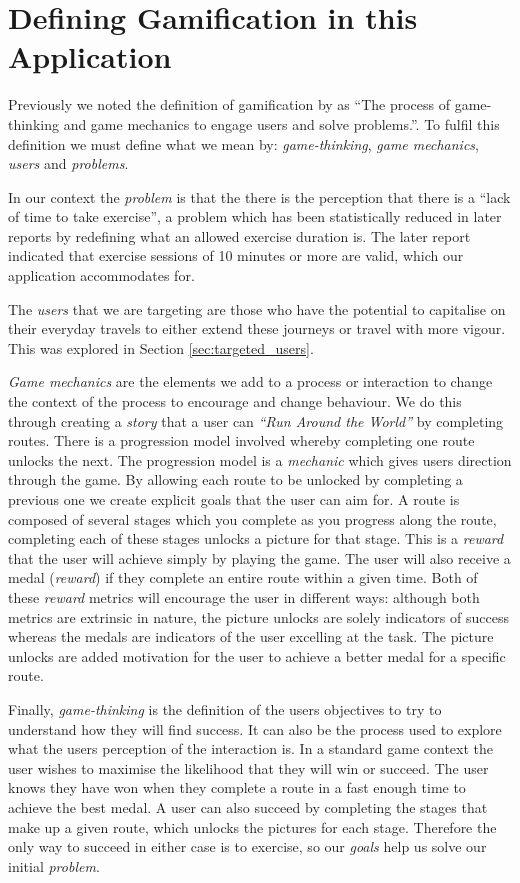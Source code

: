 \section{Defining Gamification in this Application}

Previously we noted the definition of gamification by
\citet{gamification_book} as ``The process of
game-thinking and game mechanics to engage users and solve
problems.''. To fulfil this definition we must define what we mean
by: \emph{game-thinking}, \emph{game mechanics}, \emph{users} and
\emph{problems}. 

In our context the \emph{problem} is that the there is the perception
that there is a ``lack of time to take exercise''\cite{exercise}, a
problem which has been statistically reduced in later reports by
redefining what an allowed exercise duration
is\cite{exercise_2012}. The later report indicated that exercise
sessions of 10 minutes or more are valid,  which our application
accommodates for. 

The \emph{users} that we are targeting are those who have the
potential to capitalise on their everyday travels to either extend
these journeys or travel with more vigour. This was explored in Section
\ref{sec:targeted_users}.  

\emph{Game mechanics} are the elements we add to a process or
interaction to change the context of the process to encourage
and change behaviour. We do this through creating a \emph{story} that
a user can \emph{``Run Around the World''} by completing
routes. There is a progression model involved whereby completing one
route unlocks the next. The progression model is a \emph{mechanic}
which gives users direction through the game. By allowing each route
to be unlocked by completing a previous one we create explicit goals
that the user can aim for. A route is composed of several stages which
you complete as you progress along the route, completing each of these
stages unlocks a picture for that stage. This is a \emph{reward} that
the user will achieve simply by playing the game. The user will also
receive a medal (\emph{reward}) if they complete an entire route
within a given time. Both of these \emph{reward} metrics will
encourage the user in different ways: although both metrics are
extrinsic in nature, the picture unlocks are solely indicators of
success whereas the medals are indicators of the user excelling at the
task. The picture unlocks are added motivation for the user to achieve
a better medal for a specific route.

Finally, \emph{game-thinking} is the definition of the users
objectives to try to understand how they will find success. It can
also be the process used to explore what the users perception of the
interaction is. In a standard game context the user wishes to maximise
the likelihood that they will win or succeed. The user knows they have
won when they complete a route in a fast enough time to achieve
the best medal. A user can also succeed by completing the stages that
make up a given route, which unlocks the pictures for each
stage. Therefore the only way to succeed in either case is to
exercise, so our \emph{goals} help us solve our initial
\emph{problem}. 

